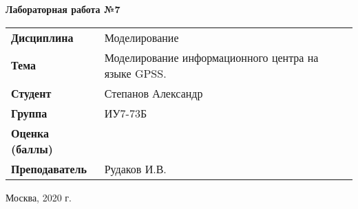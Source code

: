 \begin{center}
    \textbf{Лабораторная работа №7} \\
    \vspace{0.5cm}
\end{center}

\vspace{4cm}

\begin{flushleft}
    \begin{tabular}{ll}
        \textbf{Дисциплина} & Моделирование \\
        \textbf{Тема} & Моделирование информационного центра на языке GPSS. \\
        \textbf{Студент} & Степанов Александр \\
        \textbf{Группа} & ИУ7-73Б \\
        \textbf{Оценка (баллы)} & \\
        \textbf{Преподаватель} & Рудаков И.В. \\
    \end{tabular}
\end{flushleft}

\vspace{4cm}

\begin{center}
    Москва, 2020 г.
\end{center}
